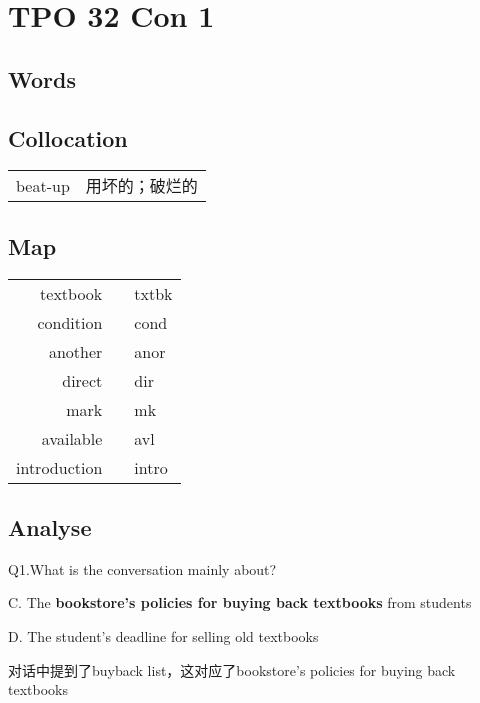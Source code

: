 \section{TPO 32 Con 1}

\subsection{Words}

\subsection{Collocation}

\begin{tabular}{ll}
    beat-up & 用坏的；破烂的 \\
\end{tabular}

\subsection{Map}

\begin{tabular}{rc@{\quad$\to$\quad}l}
    textbook     &  & txtbk \\
    condition    &  & cond  \\
    another      &  & anor  \\
    direct       &  & dir   \\
    mark         &  & mk    \\
    available    &  & avl   \\
    introduction &  & intro \\
\end{tabular}

\subsection{Analyse}

\begin{blk}
    \begin{qst}
        Q1.What is the conversation mainly about?
    \end{qst}

    \begin{chc}
        C. The \textbf{bookstore’s policies for buying back textbooks} from students

        D. The student’s deadline for selling old textbooks
    \end{chc}

    \begin{nlz}
        对话中提到了buyback list，这对应了bookstore’s policies for buying back textbooks
    \end{nlz}
\end{blk}

